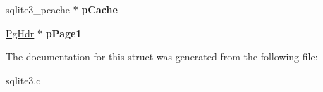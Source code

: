 \begin{DoxyCompactItemize}
\item 
\hypertarget{struct_p_cache_ad0248655d30d327e0eeced6c3651b161}{sqlite3\-\_\-pcache $\ast$ {\bfseries p\-Cache}}\label{struct_p_cache_ad0248655d30d327e0eeced6c3651b161}

\item 
\hypertarget{struct_p_cache_a190ece57aafde4310e424f82998776cb}{\hyperlink{struct_pg_hdr}{Pg\-Hdr} $\ast$ {\bfseries p\-Page1}}\label{struct_p_cache_a190ece57aafde4310e424f82998776cb}

\end{DoxyCompactItemize}


The documentation for this struct was generated from the following file\-:\begin{DoxyCompactItemize}
\item 
sqlite3.\-c\end{DoxyCompactItemize}
